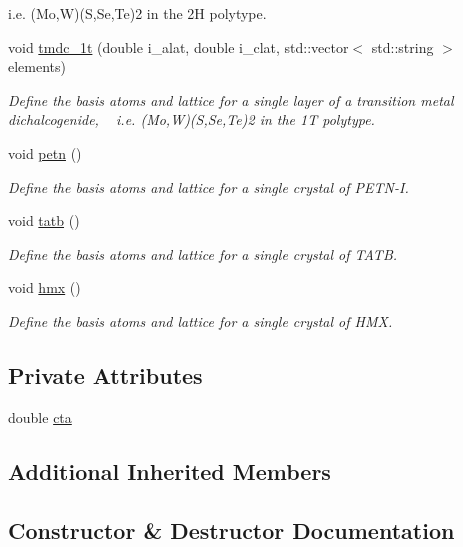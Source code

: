 \begin{DoxyCompactItemize}
\begin{DoxyCompactList}
 i.\+e. (Mo,W)(S,Se,Te)2 in the 2\+H polytype. \end{DoxyCompactList}\item 
void \hyperlink{class_structure_lib_a04f6bf9b09d1b272bd4a4c1fda4d0a8f}{tmdc\+\_\+1t} (double i\+\_\+alat, double i\+\_\+clat, std\+::vector$<$ std\+::string $>$ elements)
\begin{DoxyCompactList}\small\item\em Define the basis atoms and lattice for a single layer of a transition metal dichalcogenide, ~\newline
 i.\+e. (Mo,W)(S,Se,Te)2 in the 1\+T polytype. \end{DoxyCompactList}\item 
void \hyperlink{class_structure_lib_a94058daadb5d98d874d4c2abd22ed24c}{petn} ()
\begin{DoxyCompactList}\small\item\em Define the basis atoms and lattice for a single crystal of P\+E\+T\+N-\/\+I. \end{DoxyCompactList}\item 
void \hyperlink{class_structure_lib_a151b277d5530921f25c8c8f14047625f}{tatb} ()
\begin{DoxyCompactList}\small\item\em Define the basis atoms and lattice for a single crystal of T\+A\+T\+B. \end{DoxyCompactList}\item 
void \hyperlink{class_structure_lib_aff1f90cbd9246c37e8020b9b38c66285}{hmx} ()
\begin{DoxyCompactList}\small\item\em Define the basis atoms and lattice for a single crystal of H\+M\+X. \end{DoxyCompactList}\end{DoxyCompactItemize}
\subsection*{Private Attributes}
\begin{DoxyCompactItemize}
\item 
double \hyperlink{class_structure_lib_ac64759b20ad05f8a22855d675df1478d}{cta}
\end{DoxyCompactItemize}
\subsection*{Additional Inherited Members}


\subsection{Constructor \& Destructor Documentation}
\hypertarget{class_structure_lib_a502fa21baaf8178d3863394a449e85d3}{}
